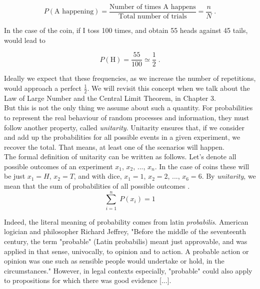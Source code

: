 \documentclass{book}
\begin{document}
\begin{equation}
	P(\text{A happening}) = \frac{\text{Number of times A happens}}{\text{Total number of trials}} = \frac{n}{N} \; . \nonumber
\end{equation}

In the case of the coin, if I toss 100 times, and obtain 55 heads against 45 tails, would lead to 

\begin{equation}
	P(\text{H}) = \frac{55}{100} \simeq \frac{1}{2} \; . \nonumber
\end{equation}

Ideally we expect that these frequencies, as we increase the number of repetitions, would approach a perfect $\frac{1}{2}$. We will revisit this concept when we talk about the Law of Large Number and the Central Limit Theorem, in Chapter 3.\\

But this is not the only thing we assume about such a quantity. For probabilities to represent the real behaviour of random processes and information, they must follow another property, called \textit{unitarity}. Unitarity ensures that, if we consider and add up the probabilities for all possible events in a given experiment, we recover the total. That means, at least one of the scenarios will happen.\\

The formal definition of unitarity can be written as follows. Let's denote all possible outcomes of an experiment $x_{1}$, $x_{2}$, ..., $x_{n}$. In the case of coins these will be just $x_{1} = H$, $x_{2} = T$, and with dice, $x_{1} = 1$, $x_{2} = 2$, ..., $x_{6} = 6$. By \textit{unitarity}, we mean that the sum of probabilities of all possible outcomes . \begin{equation}
	\sum_{i = 1}^{n} \; P(x_{i}) = 1
\end{equation}

Indeed, the literal meaning of probability comes from latin \textit{probabilis}. American logician and philosopher Richard Jeffrey, "Before the middle of the seventeenth century, the term "probable" (Latin probabilis) meant just approvable, and was applied in that sense, univocally, to opinion and to action. A probable action or opinion was one such as sensible people would undertake or hold, in the circumstances." However, in legal contexts especially, "probable" could also apply to propositions for which there was good evidence [...].\\
\end{document}
